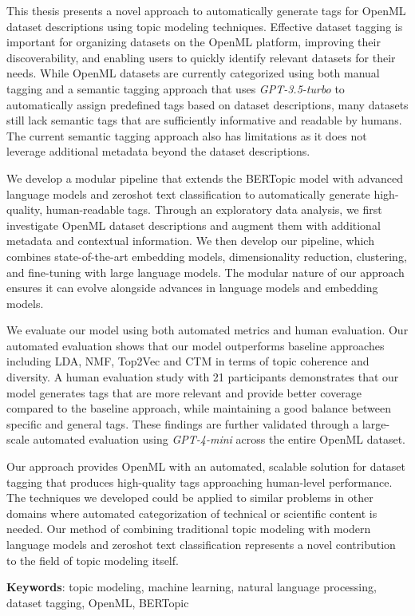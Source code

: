 This thesis presents a novel approach to automatically generate tags for OpenML dataset descriptions using topic modeling techniques. Effective dataset tagging is important for organizing datasets on the OpenML platform, improving their discoverability, and enabling users to quickly identify relevant datasets for their needs. While OpenML datasets are currently categorized using both manual tagging and a semantic tagging approach that uses \textit{GPT-3.5-turbo} to automatically assign predefined tags based on dataset descriptions, many datasets still lack semantic tags that are sufficiently informative and readable by humans. The current semantic tagging approach also has limitations as it does not leverage additional metadata beyond the dataset descriptions.

We develop a modular pipeline that extends the BERTopic model with advanced language models and zeroshot text classification to automatically generate high-quality, human-readable tags. Through an exploratory data analysis, we first investigate OpenML dataset descriptions and augment them with additional metadata and contextual information. We then develop our pipeline, which combines state-of-the-art embedding models, dimensionality reduction, clustering, and fine-tuning with large language models. The modular nature of our approach ensures it can evolve alongside advances in language models and embedding models.

We evaluate our model using both automated metrics and human evaluation. Our automated evaluation shows that our model outperforms baseline approaches including LDA, NMF, Top2Vec and CTM in terms of topic coherence and diversity. A human evaluation study with 21 participants demonstrates that our model generates tags that are more relevant and provide better coverage compared to the baseline approach, while maintaining a good balance between specific and general tags. These findings are further validated through a large-scale automated evaluation using \textit{GPT-4-mini} across the entire OpenML dataset.

Our approach provides OpenML with an automated, scalable solution for dataset tagging that produces high-quality tags approaching human-level performance. The techniques we developed could be applied to similar problems in other domains where automated categorization of technical or scientific content is needed. Our method of combining traditional topic modeling with modern language models and zeroshot text classification represents a novel contribution to the field of topic modeling itself.

\textbf{Keywords}: topic modeling, machine learning, natural language processing, dataset tagging, OpenML, BERTopic